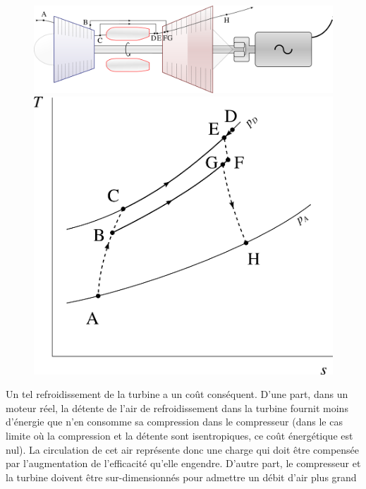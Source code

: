 		\begin{figure}
			\begin{center}
				\includegraphics[scale=0.6]{images/circuit_refroidissement_turbine.png}\vspace{0.5cm}
				\includegraphics[scale=0.8]{images/ts_gp_refroidissement_turbine.png}
			\end{center}
			\label{fig_refroidissement_turbine}
		\end{figure}

		Un tel refroidissement de la turbine a un coût conséquent. D’une part, dans un moteur réel, la détente de l’air de refroidissement dans la turbine fournit moins d’énergie que n’en consomme sa compression dans le compresseur (dans le cas limite où la compression et la détente sont isentropiques, ce coût énergétique est nul). La circulation de cet air représente donc une charge qui doit être compensée par l’augmentation de l’efficacité qu’elle engendre. D’autre part, le compresseur et la turbine doivent être sur-dimensionnés pour admettre un débit d’air plus grand

